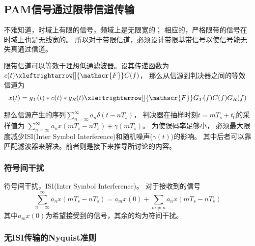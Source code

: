 \subsection{PAM信号通过限带信道传输}
    不难知道，时域上有限的信号，频域上是无限宽的；
    相应的，严格限带的信号在时域上也是无线宽的。
    所以对于带限信道，必须设计带限基带信号以使信号能无失真通过信道。

    限带信道可以等效于理想低通滤波器。设其传递函数为$c(t)\xleftrightarrow[]{\mathscr{F}}C(f)$，
    那么从信源到判决器之间的等效信道为
    \begin{equation}
        x(t)=g_T(t)*c(t)*g_R(t)\xleftrightarrow[]{\mathscr{F}}G_T(f)C(f)G_R(f)
    \end{equation}

    那么信源产生的序列$\displaystyle\sum_{n=\infty}^{\infty}a_n\delta(t-nT_s)$，
    判决器在抽样时刻$t=mT_s+t_0$的采样值为
    $\displaystyle\sum_{n=\infty}^{\infty}a_nx(mT_s-nT_s)+\gamma(mT_s)$。
    为使误码率足够小，
    必须最大限度减少ISI(Inter Symbol Interference)和随机噪声($\gamma(t)$)的影响。
    其中后者可以靠匹配滤波器来解决。前者则是接下来推导所讨论的内容。

    \subsubsection{符号间干扰}\label{subsubsec:ISI}
    符号间干扰，ISI(Inter Symbol Interference)。
    对于接收到的信号 
    \begin{equation}
        \sum_{n=\infty}^{\infty}a_nx(mT_s-nT_s)=a_mx(0)+\sum_{m\neq n}a_nx(mT_s-nT_s)
    \end{equation}
    其中$a_mx(0)$为希望接受到的信号，其余的均为符间干扰。

    \subsubsection{无ISI传输的Nyquist准则}
    
